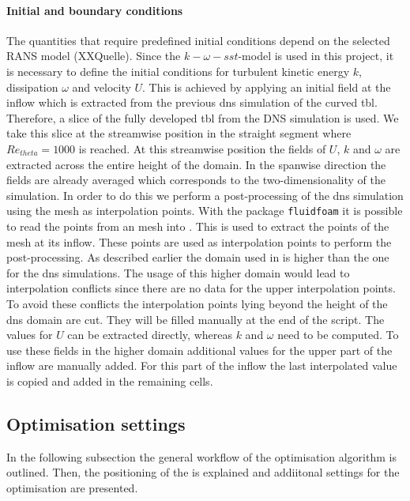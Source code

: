 \paragraph{Initial and boundary conditions}
The quantities that require predefined initial conditions depend on the selected RANS model (XXQuelle). 
Since  the $k-\omega-sst$-model is used in this project, it is necessary to define the initial conditions for turbulent kinetic energy $k$, dissipation $\omega$ and velocity $U$. 
This is achieved by applying an initial field at the inflow which is extracted from the previous \acrshort{dns} simulation of the curved \acrshort{tbl}.
Therefore, a slice of the fully developed \acrshort{tbl} from the DNS simulation is used.
We take this slice at the streamwise position in the straight segment where $Re_{theta} = 1000$ is reached.
At this streamwise position the fields of $U$, $k$ and $\omega$ are extracted across the entire height of the domain. 
In the spanwise direction the fields are already averaged which corresponds to the two-dimensionality of the  simulation.
In order to do this we perform a post-processing of the \acrshort{dns} simulation using the  mesh as interpolation points.
With the  package \texttt{fluidfoam} it is possible to read the points from an  mesh into . 
This is used to extract the points of the  mesh at its inflow.
These points are used as interpolation points to perform the post-processing. 
As described earlier the domain used in  is higher than the one for the \acrshort{dns} simulations.
The usage of this higher domain would lead to interpolation conflicts since there are no data for the upper interpolation points. 
To avoid these conflicts the interpolation points lying beyond the height of the \acrshort{dns} domain are cut.
They will be filled manually at the end of the script.
The values for $U$ can be extracted directly, whereas $k$ and $\omega$ need to be computed. 
To use these fields in the higher  domain additional values for the upper part of the inflow are manually added. 
For this part of the inflow the last interpolated value is copied and added in the remaining cells.


\subsection{Optimisation settings} \label{subsec:opt_settings}
In the following subsection the general workflow of the optimisation algorithm is outlined.
Then, the positioning of the  is explained and addiitonal settings for the optimisation are presented.

